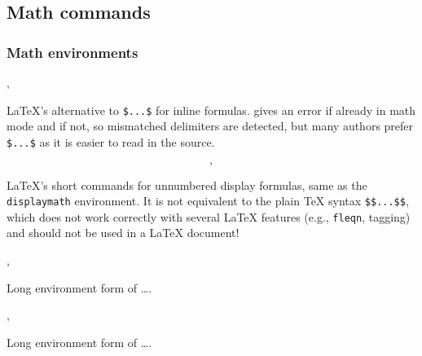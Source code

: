\documentclass{l3in2edoc}
\begin{document}
\subsection{Math commands}

\subsubsection{Math environments}


\begin{function}[user]
  {
    \(,
    \)
  }
  \begin{syntax}
    \cs{(}  \cs{)}
  \end{syntax}
  \LaTeX's alternative to \verb=$...$= for inline formulas. \cs{(}
  gives an error if already in math mode and \cs{)} if not, so
  mismatched delimiters are detected, but many authors prefer
  \verb=$...$= as it is easier to read in the source.
\end{function}


\begin{function}[user]
  {
    \[,
    \]
  }
  \begin{syntax}
    \cs{[}  \cs{]}
  \end{syntax}
  \LaTeX's short commands for unnumbered display formulas, same as the
  \texttt{displaymath} environment. It is not equivalent to the plain
  \TeX{} syntax \verb=$$...$$=, which does not work correctly with
  several \LaTeX{} features (e.g., \texttt{fleqn}, tagging) and should
  not be used in a \LaTeX{} document!
\end{function}

\begin{function}[user]
  {
    \math,
    \endmath
  }
  \begin{syntax}
       
  \end{syntax}
  Long environment form of \cs{(}\ldots\cs{)}.
\end{function}



\begin{function}[user]
  {
    \displaymath,
    \enddisplaymath
  }
  \begin{syntax}
       
  \end{syntax}
  Long environment form of \cs{[}\ldots\cs{]}.
\end{function}
\end{document}
